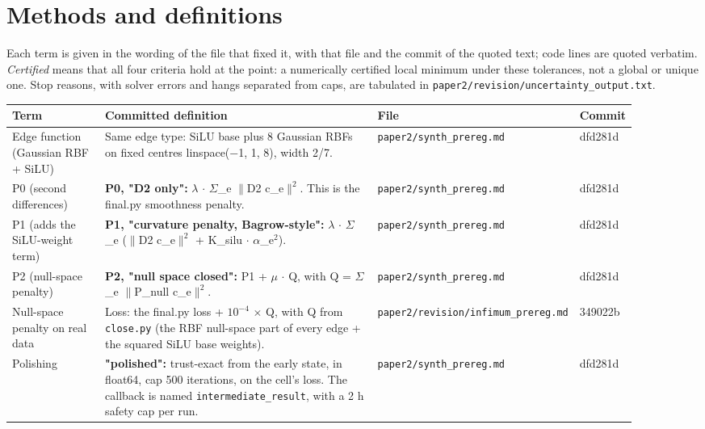 \section{Methods and definitions}\label{app:methods}
Each term is given in the wording of the file that fixed it, with that file and the commit of the quoted text; code lines are quoted verbatim. \emph{Certified} means that all four criteria hold at the point: a numerically certified local minimum under these tolerances, not a global or unique one. Stop reasons, with solver errors and hangs separated from caps, are tabulated in \texttt{paper2/revision/uncertainty\_output.txt}.
{\footnotesize\setlength{\tabcolsep}{3pt}
\begin{longtable}{R{0.16\linewidth} R{0.50\linewidth} R{0.16\linewidth} R{0.08\linewidth}}
\toprule
Term & Committed definition & File & Commit \\
\midrule
\endhead
Edge function (Gaussian RBF + SiLU) & Same edge type: SiLU base plus 8 Gaussian RBFs on fixed centres linspace($-$1, 1, 8), width 2/7. & \texttt{paper2/\allowbreak{}synth\_\allowbreak{}prereg.md} & dfd281d \\
P0 (second differences) & \textbf{P0, "D2 only":} $\lambda$ $\cdot$ $\Sigma$\_e $\|$D2 c\_e$\|^{2}$. This is the final.py smoothness penalty. & \texttt{paper2/\allowbreak{}synth\_\allowbreak{}prereg.md} & dfd281d \\
P1 (adds the SiLU-weight term) & \textbf{P1, "curvature penalty, Bagrow-style":} $\lambda$ $\cdot$ $\Sigma$\_e ($\|$D2 c\_e$\|^{2}$ + K\_silu $\cdot$ $\alpha$\_e$^{2}$). & \texttt{paper2/\allowbreak{}synth\_\allowbreak{}prereg.md} & dfd281d \\
P2 (null-space penalty) & \textbf{P2, "null space closed":} P1 + $\mu$ $\cdot$ Q, with Q = $\Sigma$\_e $\|$P\_null c\_e$\|^{2}$. & \texttt{paper2/\allowbreak{}synth\_\allowbreak{}prereg.md} & dfd281d \\
Null-space penalty on real data & Loss: the final.py loss + $10^{-4}$ $\times$ Q, with Q from \texttt{close.py} (the RBF null-space part of every edge + the squared SiLU base weights). & \texttt{paper2/\allowbreak{}revision/\allowbreak{}infimum\_\allowbreak{}prereg.md} & 349022b \\
Polishing & \textbf{"polished":} trust-exact from the early state, in float64, cap 500 iterations, on the cell's loss. The callback is named \texttt{intermediate\_\allowbreak{}result}, with a 2 h safety cap per run. & \texttt{paper2/\allowbreak{}synth\_\allowbreak{}prereg.md} & dfd281d \\

\end{longtable}}
